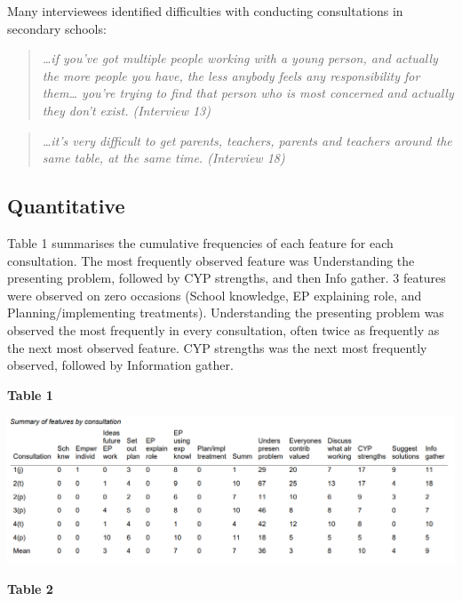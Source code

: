 \documentclass[
  english,
  man,floatsintext]{apa6}
\begin{document}
Many interviewees identified difficulties with conducting consultations
in secondary schools:

\begin{quote}
\emph{\ldots if you've got multiple people working with a young person, and
actually the more people you have, the less anybody feels any
responsibility for them\ldots{} you're trying to find that person who is
most concerned and actually they don't exist. (Interview 13)}
\end{quote}

\begin{quote}
\emph{\ldots it's very difficult to get parents, teachers, parents and teachers
around the same table, at the same time. (Interview 18)}
\end{quote}

\hypertarget{quantitative}{%
\subsection{Quantitative}\label{quantitative}}

Table 1 summarises the cumulative frequencies of each feature for each
consultation. The most frequently observed feature was Understanding the
presenting problem, followed by CYP strengths, and then Info gather. 3
features were observed on zero occasions (School knowledge, EP
explaining role, and Planning/implementing treatments). Understanding
the presenting problem was observed the most frequently in every
consultation, often twice as frequently as the next most observed
feature. CYP strengths was the next most frequently observed, followed
by Information gather.

\begin{landscape}

\textbf{Table 1}

\includegraphics{Table_1.png}

\end{landscape}

\textbf{Table 2}
\end{document}
